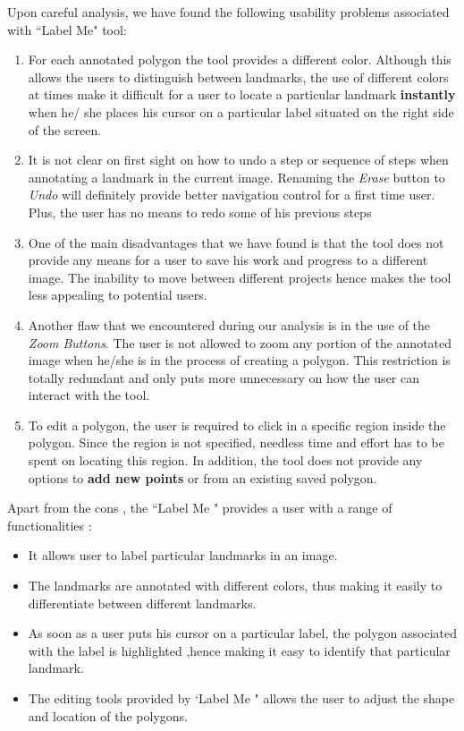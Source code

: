 \documentclass[11pt]{amsart}
\begin{document}
Upon careful analysis, we have found the following usability problems associated with ``Label Me" tool:
\begin{enumerate}
\item  For each annotated polygon the tool provides a different color. Although this allows  the users to distinguish between landmarks, the use of different colors at times make it difficult  for a user to locate a particular landmark \textbf{instantly} when he/ she places his cursor on a particular label situated on the right side of the screen.
\item It is not clear on first sight on how to undo a step or sequence of steps  when annotating a   landmark in the current image.  Renaming the \emph{ Erase} button to \emph{Undo} will definitely provide better navigation control for a first time  user. Plus, the user has no means to redo some of his previous steps
\item One of the main disadvantages that we have found is that the tool does not provide any means for a user to save his work and  progress to a different image. The inability to move between different projects hence makes the tool less appealing to potential users.
\item Another flaw that we encountered  during our analysis is in the use of the \emph{Zoom Buttons}. The user is not allowed to zoom any portion of the annotated image when he/she is in the process of creating a polygon. This restriction is totally redundant and only puts more unnecessary on how the user can interact with the tool.
\item To edit a polygon, the user is required to click in a specific region inside the polygon. Since the region is not specified, needless time and effort has to be spent on locating this region. In addition, the tool does not provide any options to \textbf{ add new points} or  from an existing saved polygon.

\end{enumerate}

Apart from the cons , the ``Label Me "  provides a user with a range of functionalities :
\begin {itemize}
\item  It allows user to label particular landmarks in an image.
\item  The landmarks are annotated with different colors, thus making it easily to differentiate between different landmarks.
\item  As soon as a user puts  his cursor on a particular label, the polygon associated with the label is highlighted ,hence making it easy to identify that particular landmark.
\item The editing tools provided by `Label Me " allows  the user to adjust the shape and location of the polygons.
\end{itemize}
\end{document}
